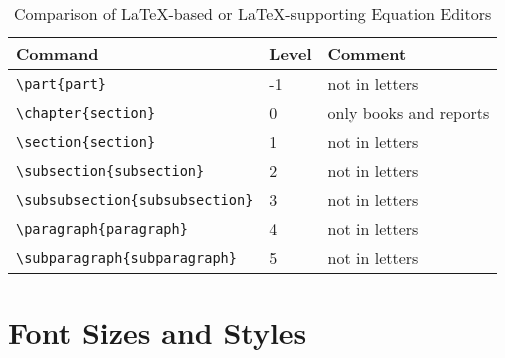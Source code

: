 \begin{table}[htbp]
\caption{Comparison of \LaTeX-based or \LaTeX-supporting Equation Editors} 
\centering
\begin{tabularx}{1\linewidth}{lll}    \addlinespace
    \toprule
    Command & Level & Comment \\
    \toprule
    \verb+\part{part}+ & -1    & not in letters \\
    \verb+\chapter{section}+ & 0     & only books and reports \\
    \verb+\section{section}+ & 1     & not in letters \\
    \verb+\subsection{subsection}+ & 2     & not in letters \\
    \verb+\subsubsection{subsubsection}+ & 3     & not in letters \\
    \verb+\paragraph{paragraph}+ & 4     & not in letters \\
    \verb+\subparagraph{subparagraph}+ & 5     & not in letters \\
    \bottomrule
    \end{tabularx}%
  \label{tab1:section_depth}%
\end{table}%

\section{Font Sizes and Styles}

